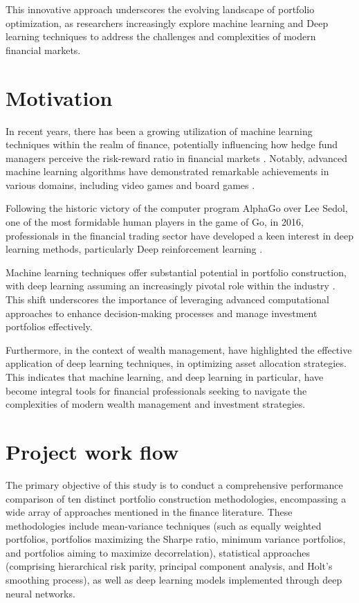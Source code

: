 This innovative approach underscores the evolving landscape of portfolio optimization, as researchers increasingly explore machine learning and Deep learning techniques to address the challenges and complexities of modern financial markets.

\section{Motivation}\label{I_Motivation}

In recent years, there has been a growing utilization of machine learning techniques within the realm of finance, potentially influencing how hedge fund managers perceive the risk-reward ratio in financial markets \citep{Wu20218119}. Notably, advanced machine learning algorithms have demonstrated remarkable achievements in various domains, including video games \citep{Mnih2015529} and board games \citep{Silver2016484}.

Following the historic victory of the computer program AlphaGo over Lee Sedol, one of the most formidable human players in the game of Go, in 2016, professionals in the financial trading sector have developed a keen interest in deep learning methods, particularly Deep reinforcement learning \citep{meng2019reinforcement}.

Machine learning techniques offer substantial potential in portfolio construction, with deep learning assuming an increasingly pivotal role within the industry \citep{Bartram20219}. This shift underscores the importance of leveraging advanced computational approaches to enhance decision-making processes and manage investment portfolios effectively.

Furthermore, in the context of wealth management, \citep{li2020asset} have highlighted the effective application of deep learning techniques, in optimizing asset allocation strategies. This indicates that machine learning, and deep learning in particular, have become integral tools for financial professionals seeking to navigate the complexities of modern wealth management and investment strategies.




\section{Project work flow}\label{I_workflow}
The primary objective of this study is to conduct a comprehensive performance comparison of ten distinct portfolio construction methodologies, encompassing a wide array of approaches mentioned in the finance literature. These methodologies include mean-variance techniques (such as equally weighted portfolios, portfolios maximizing the Sharpe ratio, minimum variance portfolios, and portfolios aiming to maximize decorrelation), statistical approaches (comprising hierarchical risk parity, principal component analysis, and Holt's smoothing process), as well as deep learning models implemented through deep neural networks.

